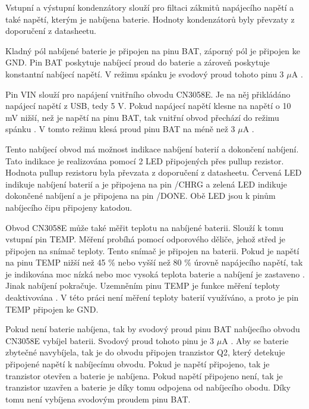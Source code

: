 
Vstupní a výstupní kondenzátory slouží pro filtaci zákmitů napájecího napětí a také napětí, kterým je nabíjena baterie. Hodnoty kondenzátorů byly převzaty
z doporučení z datasheetu.

Kladný pól nabíjené baterie je připojen na pinu BAT, záporný pól je připojen ke GND. Pin BAT poskytuje nabíjecí proud do baterie a zároveň poskytuje konstantní 
nabíjecí napětí. V režimu spánku je svodový proud tohoto pinu 3 $\mu$A \cite{charger_dtsh}. 

Pin VIN slouží pro napájení vnitřního obvodu CN3058E. Je na něj přikládáno napájecí napětí z USB, tedy 5 V. Pokud napájecí napětí klesne na napětí o 10 mV nižší, 
než je napětí na pinu BAT, tak vnitřní obvod přechází do režimu spánku \cite{charger_dtsh}. V tomto režimu klesá proud pinu BAT na méně než 3 $\mu$A \cite{charger_dtsh}.

Tento nabíjecí obvod má možnost indikace nabíjení baterií a dokončení nabíjení. Tato indikace je realizována pomocí 2 LED připojených přes pullup rezistor. Hodnota
pullup rezistoru byla převzata z doporučení z datasheetu. Červená LED indikuje nabíjení baterií a je připojena na pin /CHRG a zelená LED indikuje dokončené nabíjení 
a je připojena na pin /DONE. Obě LED jsou k pinům nabíjecího čipu připojeny katodou. 

Obvod CN3058E může také měřit teplotu na nabíjené baterii. Slouží k tomu vstupní pin TEMP. Měření probíhá pomocí odporového děliče, jehož střed je připojen na snímač 
teploty. Tento snímač je připojen na baterii. Pokud je napětí na pinu TEMP nižší než 45 \% nebo vyšší než 80 \% úrovně napájecího napětí, tak je indikována moc nízká
nebo moc vysoká teplota baterie a nabíjení je zastaveno \cite{charger_dtsh}. Jinak nabíjení pokračuje. Uzemněním pinu TEMP je funkce měření teploty deaktivována \cite{charger_dtsh}. 
V této práci není měření teploty baterií využíváno, a proto je pin TEMP připojen ke GND. 


Pokud není baterie nabíjena, tak by svodový proud pinu BAT nabíjecího obvodu CN3058E vybíjel baterii. Svodový proud tohoto pinu je 3 $\mu$A \cite{charger_dtsh}. 
Aby se baterie zbytečné navybíjela, tak je do obvodu připojen tranzistor Q2, který detekuje připojené napětí k nabíjecímu obvodu. Pokud je napětí připojeno, tak je 
tranzistor otevřen a baterie je nabíjena. Pokud napětí připojeno není, tak je tranzistor uzavřen a baterie je díky tomu odpojena od nabíjecího obodu. Díky tomu 
není vybíjena svodovým proudem pinu BAT. 

